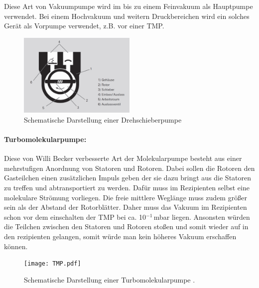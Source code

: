  Diese Art von Vakuumpumpe wird im bis zu einem Feinvakuum als Hauptpumpe verwendet. Bei einem Hochvakuum und weitern Druckbereichen wird
 ein solches Gerät als Vorpumpe verwendet, z.B. vor einer TMP.

 \begin{figure}
   \centering
   \includegraphics[width=0.5\textwidth]{Drehschieberpumpe.png}
   \caption{Schematische Darstellung einer Drehschieberpumpe \cite{DSP}}
   \label{fig:DSP}
 \end{figure}

 \paragraph{Turbomolekularpumpe:}
 Diese von Willi Becker verbesserte Art der Molekularpumpe besteht aus einer mehrstufigen Anordnung von Statoren und Rotoren. Dabei sollen die
 Rotoren den Gasteilchen einen zusätzlichen Impuls geben der sie dazu bringt aus die Statoren zu treffen und abtransportiert zu werden. Dafür
 muss im Rezipienten selbst eine molekulare Strömung vorliegen. Die freie mittlere Weglänge muss zudem größer sein als der Abstand der Rotorblätter.
 Daher muss das Vakuum im Rezipienten schon vor dem einschalten der TMP bei ca. 10$^{-1}\,$mbar liegen. Ansonsten würden die Teilchen zwischen
 den Statoren und Rotoren stoßen und somit wieder auf in den rezipienten gelangen, somit würde man kein höheres Vakuum erschaffen können.
\begin{figure}
  \centering
  \texttt{[image: TMP.pdf]}
  \caption{Schematische Darstellung einer Turbomolekularpumpe \cite{TMP}.}
  \label{fig:TMP}
\end{figure}
\FloatBarrier

